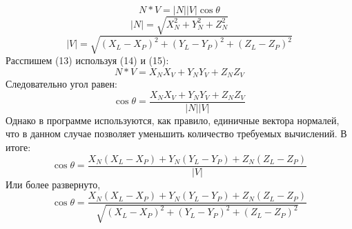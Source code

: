 \documentclass[a4paper, 10pt]{article}
\begin{document}
	\begin{equation}
		N * V = |N||V|\cos\theta
	\end{equation}
	\begin{equation}
		|N| = \sqrt{X_N^2 + Y_N^2 + Z_N^2}
	\end{equation}
	\begin{equation}
		|V| = \sqrt{(X_L - X_P)^2 + (Y_L - Y_P)^2 + (Z_L - Z_P)^2}
	\end{equation}
	Расспишем (13) используя (14) и (15):
	\begin{equation}
		N * V = X_NX_V + Y_NY_V + Z_NZ_V
	\end{equation}
	Следовательно угол равен:
		\begin{equation}
		\cos\theta = \frac{X_NX_V + Y_NY_V + Z_NZ_V}{|N||V|}
	\end{equation}
	Однако в программе используются, как правило, единичные вектора нормалей, что в данном случае позволяет уменьшить количество требуемых вычислений. В итоге:
	\begin{equation}
		\cos\theta = \frac{X_N(X_L - X_P) + Y_N(Y_L - Y_P) + Z_N(Z_L - Z_P)}{|V|}
	\end{equation}
	Или более развернуто,
	\begin{equation}
		\cos\theta = \frac{X_N(X_L - X_P) + Y_N(Y_L - Y_P) + Z_N(Z_L - Z_P)}{\sqrt{(X_L - X_P)^2 + (Y_L - Y_P)^2 + (Z_L - Z_P)^2}}
	\end{equation}
\end{document}
